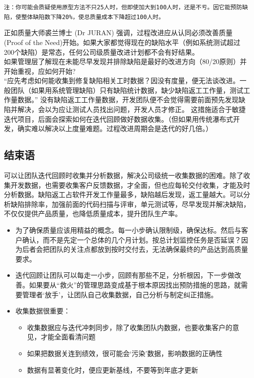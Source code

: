 \texttt{注：你可能会质疑使用原型方法不只25人时，但即使加大到100人时，还是不亏。因它能预防缺陷，使整体缺陷数下降20\%，使总质量成本下降超过100人时。}

正如质量大师裘兰博士 (Dr JURAN) 强调，过程改进应从认同必须改善质量(Proof
of the
Need)开始。如果大家都觉得现在的缺陷水平（例如系统测试超过200个缺陷）是常态，任何公司级质量改进计划都不会有好结果。\\
如果管理层了解现在未能尽早发现并排除缺陷是最好的改进方向（80/20原则）并开始重视，应如何开始?\\
``应先考虑如何能收集到修复缺陷相关工时数据？因没有度量，便无法谈改进。一般团队（如果用系统管理缺陷）只有缺陷统计数据，缺少缺陷返工工作量，测试工作量数据。''
没有缺陷返工工作量数据，开发团队便不会觉得需要前面预先发现缺陷并解决，会以为应让测试人员找出问题，开发人员才修正。
这措施适合于敏捷迭代项目，后面会探索如何在迭代回顾做好数据收集。（但如果用传统瀑布式开发，确实难以解决以上度量难题。过程改进周期会是迭代的好几倍。）\\

\hypertarget{ux7ed3ux675fux8bed}{%
\subsection{结束语}\label{ux7ed3ux675fux8bed}}

可以让团队迭代回顾时收集并分析数据，解决公司级统一收集数据的困难。除了收集开发数据，也需要收集客户反馈数据，才全面，但也应每轮交付收集，才能及时分析数据。缺陷返工占软件开发工作量最多，缺陷越后发现，返工量越大。可以分析缺陷排除率，加强前面的代码扫描与评审，单元测试等，尽早发现并解决缺陷，不仅仅提供产品质量，也降低质量成本，提升团队生产率。

\begin{itemize}
\tightlist
\item
  为了确保质量应该用精益的概念。每一小步确认限制级，确保达标。然后与客户确认，而不是先定一个总体的几个月计划。按总计划监控任务是否延误？因为后者会把团队的关注点都放到按时交付去，无法确保最终的产品达到高质量要求。
\item
  迭代回顾让团队可以每走一小步，回顾有那些不足，分析根因，下一步做改善。如果要从``救火''的管理思路变成基于根本原因找出预防措施的思路，就需要管理者`放手'，让团队自己收集数据，自己分析与制定纠正措施。
\item
  收集数据很重要：

  \begin{itemize}
  \tightlist
  \item
    收集数据应与迭代冲刺同步，除了收集团队内数据，也要收集客户的意见，才能全面看清问题
  \item
    如果把数据关连到绩效，很可能会`污染'数据，影响数据的正确性
  \item
    数据有显著变化时，便应更新基线，不要等到年底才更新
  \end{itemize}
\end{itemize}

